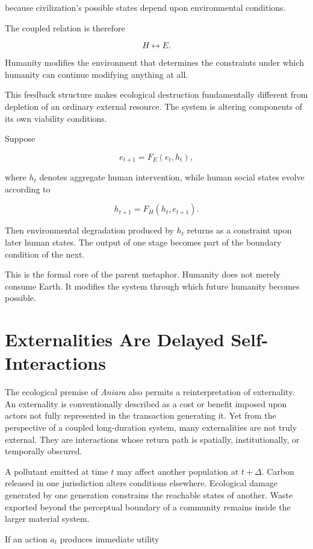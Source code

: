 \documentclass[11pt,oneside]{book}
\theoremstyle{definition}
\theoremstyle{remark}
\begin{document}
because civilization's possible states depend upon environmental conditions.

The coupled relation is therefore

\[
H\leftrightarrow E.
\]

Humanity modifies the environment that determines the constraints under which humanity can continue modifying anything at all.

This feedback structure makes ecological destruction fundamentally different from depletion of an ordinary external resource. The system is altering components of its own viability conditions.

Suppose

\[
e_{t+1}
=
F_E(e_t,h_t),
\]

where \(h_t\) denotes aggregate human intervention, while human social states evolve according to

\[
h_{t+1}
=
F_H(h_t,e_{t+1}).
\]

Then environmental degradation produced by \(h_t\) returns as a constraint upon later human states. The output of one stage becomes part of the boundary condition of the next.

This is the formal core of the parent metaphor. Humanity does not merely consume Earth. It modifies the system through which future humanity becomes possible.

\section{Externalities Are Delayed Self-Interactions}

The ecological premise of \emph{Aniara} also permits a reinterpretation of externality. An externality is conventionally described as a cost or benefit imposed upon actors not fully represented in the transaction generating it. Yet from the perspective of a coupled long-duration system, many externalities are not truly external. They are interactions whose return path is spatially, institutionally, or temporally obscured.

A pollutant emitted at time \(t\) may affect another population at \(t+\Delta\). Carbon released in one jurisdiction alters conditions elsewhere. Ecological damage generated by one generation constrains the reachable states of another. Waste exported beyond the perceptual boundary of a community remains inside the larger material system.

If an action \(a_t\) produces immediate utility
\end{document}
